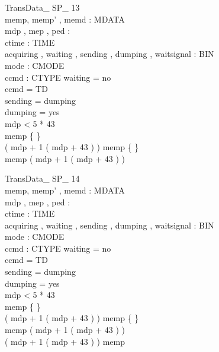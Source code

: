\begin{schema}{TransData\_ SP\_ 13}\\
 memp, memp' , memd : \seq MDATA \\
 mdp , mep , ped : \nat \\
 ctime : TIME \\
 acquiring , waiting , sending , dumping , waitsignal : BIN \\
 mode : CMODE \\
 ccmd : CTYPE 
\where
 waiting = no \\
 ccmd = TD \\
 sending = dumping \\
 dumping = yes \\
 mdp < 5 * 43 \\
 memp \neq \{ \} \\
 ( mdp + 1 \upto ( mdp + 43 ) ) \cap \dom memp \neq \{ \} \\
 \dom memp \subset ( mdp + 1 \upto ( mdp + 43 ) )
\end{schema}


\begin{schema}{TransData\_ SP\_ 14}\\
 memp, memp' , memd : \seq MDATA \\
 mdp , mep , ped : \nat \\
 ctime : TIME \\
 acquiring , waiting , sending , dumping , waitsignal : BIN \\
 mode : CMODE \\
 ccmd : CTYPE 
\where
 waiting = no \\
 ccmd = TD \\
 sending = dumping \\
 dumping = yes \\
 mdp < 5 * 43 \\
 memp \neq \{ \} \\
 ( mdp + 1 \upto ( mdp + 43 ) ) \cap \dom memp \neq \{ \} \\
 \lnot \dom memp \subseteq ( mdp + 1 \upto ( mdp + 43 ) ) \\
 \lnot ( mdp + 1 \upto ( mdp + 43 ) ) \subseteq \dom memp
\end{schema}

